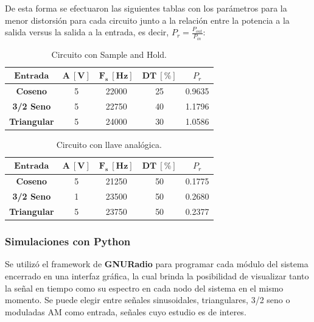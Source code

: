 De esta forma se efectuaron las siguientes tablas con los parámetros para la menor distorsión para cada circuito junto a la relación entre la potencia a la salida versus la salida a la entrada, es decir, $P_r = \frac{P_{out}}{P_{in}}$:
\begin{multicols}{2}
\begin{table}[H]
\centering
\begin{tabular}{ccccc}
\hline
$\mathbf{Entrada}$  & $\mathbf{A \ [V]}$ & $\mathbf{F_s \ [Hz]}$ & $\mathbf{DT \ [\%]}$ & $P_r$\\ \hline
\textbf{Coseno}     & 5                 & 22000                 & 25         &      0.9635     \\
\textbf{3/2 Seno}   & 5                & 22750                 & 40           &    1.1796     \\
\textbf{Triangular} & 5                  & 24000                 & 30          &       1.0586 	\\ \hline
\end{tabular}
\caption{Circuito con Sample and Hold.}
\label{tab:res1}
\end{table}
\begin{table}[H]
\centering
\begin{tabular}{ccccc}
\hline
$\mathbf{Entrada}$  & $\mathbf{A \ [V]}$ & $\mathbf{F_s \ [Hz]}$ & $\mathbf{DT \ [\%]}$ &$P_r$ \\ \hline
\textbf{Coseno}     & 5                  & 21250                 & 50       &     0.1775       \\
\textbf{3/2 Seno}   & 1                  & 23500                 & 50        &      0.2680     \\
\textbf{Triangular} & 5                  & 23750                 & 50         &    0.2377      \\ \hline
\end{tabular}
\caption{Circuito con llave analógica.}
\label{tab:res2}
\end{table}
\end{multicols}


\subsubsection{Simulaciones con Python}
Se utilizó el framework de \textbf{GNURadio} para programar cada módulo del sistema encerrado en una interfaz gráfica, la cual brinda la posibilidad de visualizar tanto la señal en tiempo como su espectro en cada nodo del sistema en el mismo momento. Se puede elegir entre señales sinusoidales, triangulares, 3/2 seno o moduladas AM como entrada, señales cuyo estudio es de interes.

